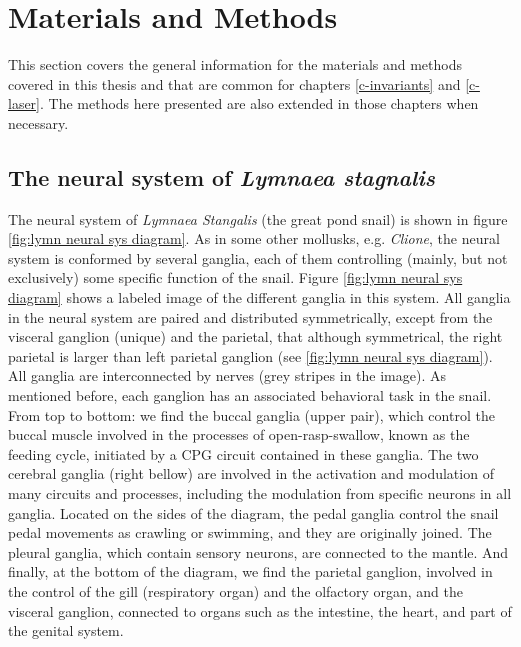\chapter{Materials and Methods}
This section covers the general information for the materials and methods covered in this thesis and that are common for chapters \ref{c-invariants} and \ref{c-laser}. The methods here presented are also extended in those chapters when necessary.


\section{The neural system of \textit{Lymnaea stagnalis}}
\label{sec:lymnaea morphology}
The neural system of \textit{Lymnaea Stangalis} (the great pond snail) is shown in figure \ref{fig:lymn neural sys diagram}. As in some other mollusks, e.g. {\sl Clione}, the neural system is conformed by several ganglia, each of them controlling (mainly, but not exclusively) some specific function of the snail. Figure \ref{fig:lymn neural sys diagram} shows a labeled image of the different ganglia in this system. All ganglia in the neural system are paired and distributed symmetrically, except from the visceral ganglion (unique) and the parietal, that although symmetrical, the right parietal is larger than left parietal ganglion (see \ref{fig:lymn neural sys diagram}). All ganglia are interconnected by nerves (grey stripes in the image). As mentioned before, each ganglion has an associated behavioral task in the snail. From top to bottom: we find the buccal ganglia (upper pair), which control the buccal muscle involved in the processes of open-rasp-swallow, known as the feeding cycle, initiated by a CPG circuit contained in these ganglia. The two cerebral ganglia (right bellow) are involved in the activation and modulation of many circuits and processes, including the modulation from specific neurons in all ganglia. Located on the sides of the diagram, the pedal ganglia control the snail pedal movements as crawling or swimming, and they are originally joined. The pleural ganglia, which contain sensory neurons, are connected to the mantle. And finally, at the bottom of the diagram, we find the parietal ganglion, involved in the control of the gill (respiratory organ) and the olfactory organ, and the visceral ganglion, connected to organs such as the intestine, the heart, and part of the genital system.


